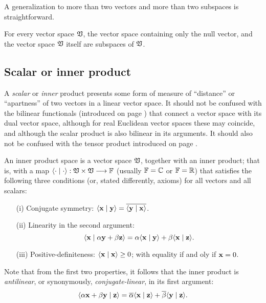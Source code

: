 A generalization to more than two vectors and more than two subspaces is straightforward.


For every vector space ${\frak V}$, the vector space containing only the null vector,
 and the vector space ${\frak V}$ itself are subspaces of ${\frak V}$.

\subsection{Scalar or inner product}
\label{2011-m-scalarproduct}

A {\em scalar} or {\em inner} product presents some form of measure of ``distance'' or ``apartness''
of two vectors in a linear vector space.
It should not be confused with the bilinear functionals (introduced on page \pageref{2011-m-dvs}) that connect a vector space with its dual vector space,
although for real Euclidean vector spaces these may coincide,
and although the scalar product is also bilinear in its arguments.
It should also not be confused with the tensor product introduced on page \pageref{2011-m-tensorp}.

An inner product space is a vector space $\frak V$,
together with an inner product; that is, with a map
 $\langle \cdot \mid \cdot \rangle :  \frak V  \times  \frak V  \longrightarrow {\Bbb F}$
 (usually ${\Bbb F}={\Bbb C}$ or ${\Bbb F}={\Bbb R}$)
 that satisfies the following three conditions (or, stated differently, axioms) for all vectors  and all scalars:
\begin{itemize}
\item[(i)]
Conjugate symmetry:
$
\langle {\bf x}\mid {\bf y}\rangle
=
\overline{\langle {\bf y}\mid {\bf x}\rangle }$.
\item[(ii)]
Linearity in the second argument:
$$
\langle {\bf x} \mid \alpha {\bf y} +\beta {\bf z}\rangle
=
\alpha {\langle {\bf x}\mid {\bf y}\rangle}
+
\beta {\langle {\bf x}\mid {\bf z}\rangle}
.
$$

\item[(iii)]
Positive-definiteness:
$
\langle {\bf x}\mid {\bf x}\rangle
\ge
0$;  with equality if and oly if ${\bf x} = 0$.
\end{itemize}

 Note that from the first two properties, it follows that the inner product is
{\em antilinear}, or synonymously,
{\em conjugate-linear}, in its first argument:
 $$
 \langle \alpha {\bf x} + \beta {\bf y} \mid {\bf z}\rangle
 =
 \overline{\alpha} {\langle {\bf x}\mid {\bf z}\rangle}
 +\overline{\beta} {\langle {\bf y}\mid {\bf z}\rangle}
.
 $$



